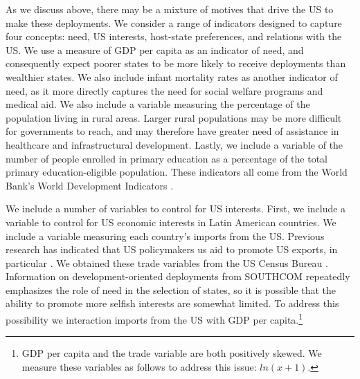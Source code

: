 \documentclass[12pt]{article}
\begin{document}
\begin{doublespace}
As we discuss above, there may be a mixture of motives that drive the US to make these deployments. We consider a range of indicators designed to capture four concepts: need, US interests, host-state preferences, and relations with the US. We use a measure of GDP per capita as an indicator of need, and consequently expect poorer states to be more likely to receive deployments than wealthier states. We also include infant mortality rates as another indicator of need, as it more directly captures the need for social welfare programs and medical aid. We also include a variable measuring the percentage of the population living in rural areas. Larger rural populations may be more difficult for governments to reach, and may therefore have greater need of assistance in healthcare and infrastructural development. Lastly, we include a variable of the number of people enrolled in primary education as a percentage of the total primary education-eligible population. These indicators all come from the World Bank's World Development Indicators \cite{WDI2015}.

We include a number of variables to control for US interests. First, we include a variable to control for US economic interests in Latin American countries. We include a variable measuring each country's imports from the US. Previous research has indicated that US policymakers us aid to promote US exports, in particular \cite{FleckKilby2006,MilnerTingley2010}. We obtained these trade variables from the US Census Bureau \cite{Census2015}. Information on development-oriented deployments from SOUTHCOM repeatedly emphasizes the role of need in the selection of states, so it is possible that the ability to promote more selfish interests are somewhat limited. To address this possibility we interaction imports from the US with GDP per capita.\footnote{GDP per capita and the trade variable are both positively skewed. We measure these variables as follows to address this issue: $ln(x+1)$.} 


\end{doublespace}
\end{document}
